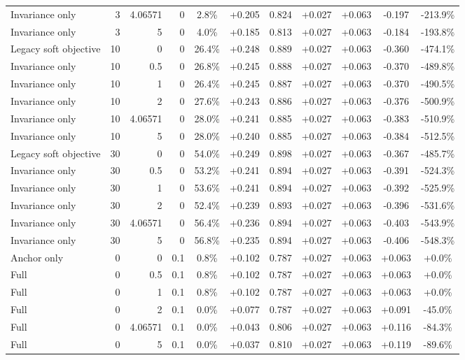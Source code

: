 \begin{table}[htbp]
\begin{tabular}{lrrrccccccc}
Invariance only & 3 & 4.06571 & 0 & 2.8\% & +0.205 & 0.824 & +0.027 & +0.063 & -0.197 & -213.9\% \\
Invariance only & 3 & 5 & 0 & 4.0\% & +0.185 & 0.813 & +0.027 & +0.063 & -0.184 & -193.8\% \\
Legacy soft objective & 10 & 0 & 0 & 26.4\% & +0.248 & 0.889 & +0.027 & +0.063 & -0.360 & -474.1\% \\
Invariance only & 10 & 0.5 & 0 & 26.8\% & +0.245 & 0.888 & +0.027 & +0.063 & -0.370 & -489.8\% \\
Invariance only & 10 & 1 & 0 & 26.4\% & +0.245 & 0.887 & +0.027 & +0.063 & -0.370 & -490.5\% \\
Invariance only & 10 & 2 & 0 & 27.6\% & +0.243 & 0.886 & +0.027 & +0.063 & -0.376 & -500.9\% \\
Invariance only & 10 & 4.06571 & 0 & 28.0\% & +0.241 & 0.885 & +0.027 & +0.063 & -0.383 & -510.9\% \\
Invariance only & 10 & 5 & 0 & 28.0\% & +0.240 & 0.885 & +0.027 & +0.063 & -0.384 & -512.5\% \\
Legacy soft objective & 30 & 0 & 0 & 54.0\% & +0.249 & 0.898 & +0.027 & +0.063 & -0.367 & -485.7\% \\
Invariance only & 30 & 0.5 & 0 & 53.2\% & +0.241 & 0.894 & +0.027 & +0.063 & -0.391 & -524.3\% \\
Invariance only & 30 & 1 & 0 & 53.6\% & +0.241 & 0.894 & +0.027 & +0.063 & -0.392 & -525.9\% \\
Invariance only & 30 & 2 & 0 & 52.4\% & +0.239 & 0.893 & +0.027 & +0.063 & -0.396 & -531.6\% \\
Invariance only & 30 & 4.06571 & 0 & 56.4\% & +0.236 & 0.894 & +0.027 & +0.063 & -0.403 & -543.9\% \\
Invariance only & 30 & 5 & 0 & 56.8\% & +0.235 & 0.894 & +0.027 & +0.063 & -0.406 & -548.3\% \\
Anchor only & 0 & 0 & 0.1 & 0.8\% & +0.102 & 0.787 & +0.027 & +0.063 & +0.063 & +0.0\% \\
Full & 0 & 0.5 & 0.1 & 0.8\% & +0.102 & 0.787 & +0.027 & +0.063 & +0.063 & +0.0\% \\
Full & 0 & 1 & 0.1 & 0.8\% & +0.102 & 0.787 & +0.027 & +0.063 & +0.063 & +0.0\% \\
Full & 0 & 2 & 0.1 & 0.0\% & +0.077 & 0.787 & +0.027 & +0.063 & +0.091 & -45.0\% \\
Full & 0 & 4.06571 & 0.1 & 0.0\% & +0.043 & 0.806 & +0.027 & +0.063 & +0.116 & -84.3\% \\
Full & 0 & 5 & 0.1 & 0.0\% & +0.037 & 0.810 & +0.027 & +0.063 & +0.119 & -89.6\% \\

\end{tabular}
\end{table}
